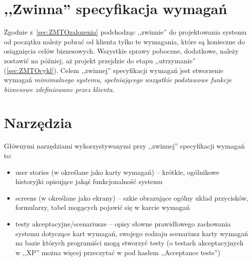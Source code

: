 \section{,,Zwinna'' specyfikacja wymagań}
\label{sec:zwinnaSpecyfikacjaWymagan}


Zgodnie z~\ref{sec:ZMTOzalozenia} podchodząc ,,zwinnie'' do projektowania systemu od początku należy pobrać od klienta tylko te wymagania, które są konieczne do osiągnięcia celów biznesowych. Wszystkie sprawy poboczne, dodatkowe, należy zostawić na później, aż projekt przejdzie do etapu ,,utrzymanie'' (\ref{sec:ZMTOcykl}). Celem ,,zwinnej'' specyfikacji wymagań jest stworzenie wymagań \emph{mimimalnego systemu, spełniającego wszystkie podstawowe funkcje biznesowe zdefiniowane przez klienta}.

\section{Narzędzia}
\label{sec:ZSWnarzedzia}

Głównymi narzędziami wykorzystywanymi przy ,,zwinnej'' specyfikacji wymagań to:
\begin{itemize}
    \item user stories (w \cite{Mad09} określane jako karty wymagań) -- krótkie, ogólnikowe historyjki opisujące jakąś funkcjonalność systemu
    \item screens (w \cite{Mad09} określane jako ekrany) -- szkie obrazujące ogólny układ przycisków, formularzy, tabel mogących pojawić się w karcie wymagań
    \item testy akceptacyjne/scenariusze -- opisy słowne prawidłowego zachowania systemu dotyczące kart wymagań, swojego rodzaju scenariusz karty wymagań na bazie których programiści mogą stworzyć testy (o testach akceptacyjnych w ,,XP'' można więcej przeczytać w \cite{Jef00} pod hasłem ,,Acceptance tests'')  
\end{itemize}

